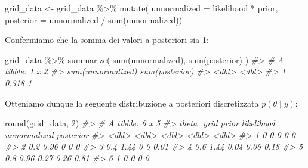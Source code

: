 \documentclass[
]{memoir}
\newenvironment{Shaded}{\begin{snugshade}}{\end{snugshade}}
\newcommand{\AttributeTok}[1]{\textcolor[rgb]{0.77,0.63,0.00}{#1}}
\newcommand{\CommentTok}[1]{\textcolor[rgb]{0.56,0.35,0.01}{\textit{#1}}}
\newcommand{\DecValTok}[1]{\textcolor[rgb]{0.00,0.00,0.81}{#1}}
\newcommand{\FunctionTok}[1]{\textcolor[rgb]{0.00,0.00,0.00}{#1}}
\newcommand{\NormalTok}[1]{#1}
\newcommand{\OtherTok}[1]{\textcolor[rgb]{0.56,0.35,0.01}{#1}}
\newcommand{\SpecialCharTok}[1]{\textcolor[rgb]{0.00,0.00,0.00}{#1}}
\begin{document}
\begin{Shaded}
\begin{Highlighting}[]
\NormalTok{grid\_data }\OtherTok{\textless{}{-}}\NormalTok{ grid\_data }\SpecialCharTok{\%\textgreater{}\%}
  \FunctionTok{mutate}\NormalTok{(}
    \AttributeTok{unnormalized =}\NormalTok{ likelihood }\SpecialCharTok{*}\NormalTok{ prior,}
    \AttributeTok{posterior =}\NormalTok{ unnormalized }\SpecialCharTok{/} \FunctionTok{sum}\NormalTok{(unnormalized))}
\end{Highlighting}
\end{Shaded}

\noindent
Confermiamo che la somma dei valori a posteriori sia 1:

\begin{Shaded}
\begin{Highlighting}[]
\NormalTok{grid\_data }\SpecialCharTok{\%\textgreater{}\%}
  \FunctionTok{summarize}\NormalTok{(}
    \FunctionTok{sum}\NormalTok{(unnormalized),}
    \FunctionTok{sum}\NormalTok{(posterior)}
\NormalTok{  )}
\CommentTok{\#\textgreater{} \# A tibble: 1 x 2}
\CommentTok{\#\textgreater{}   \textasciigrave{}sum(unnormalized)\textasciigrave{} \textasciigrave{}sum(posterior)\textasciigrave{}}
\CommentTok{\#\textgreater{}                 \textless{}dbl\textgreater{}            \textless{}dbl\textgreater{}}
\CommentTok{\#\textgreater{} 1               0.318                1}
\end{Highlighting}
\end{Shaded}

\noindent
Otteniamo dunque la seguente distribuzione a posteriori discretizzata \(p(\theta \mid y)\):

\begin{Shaded}
\begin{Highlighting}[]
\FunctionTok{round}\NormalTok{(grid\_data, }\DecValTok{2}\NormalTok{)}
\CommentTok{\#\textgreater{} \# A tibble: 6 x 5}
\CommentTok{\#\textgreater{}   theta\_grid prior likelihood unnormalized posterior}
\CommentTok{\#\textgreater{}        \textless{}dbl\textgreater{} \textless{}dbl\textgreater{}      \textless{}dbl\textgreater{}        \textless{}dbl\textgreater{}     \textless{}dbl\textgreater{}}
\CommentTok{\#\textgreater{} 1        0    0          0            0         0   }
\CommentTok{\#\textgreater{} 2        0.2  0.96       0            0         0   }
\CommentTok{\#\textgreater{} 3        0.4  1.44       0            0         0.01}
\CommentTok{\#\textgreater{} 4        0.6  1.44       0.04         0.06      0.18}
\CommentTok{\#\textgreater{} 5        0.8  0.96       0.27         0.26      0.81}
\CommentTok{\#\textgreater{} 6        1    0          0            0         0}
\end{Highlighting}
\end{Shaded}
\end{document}
